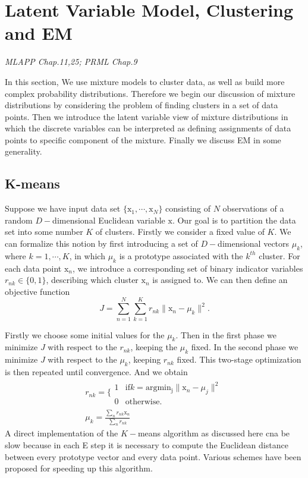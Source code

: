 \documentclass{article}
\newcommand{\mrm}{\mathrm}
\begin{document}
\section{Latent Variable Model, Clustering and EM}
\emph{MLAPP Chap.11,25; PRML Chap.9}

In this section, We use mixture models to cluster data, as well as build more complex probability distributions. Therefore we begin our discussion of mixture distributions by considering the problem of finding clusters in a set of data points. Then we introduce the latent variable view of mixture distributions in which the discrete variables can be interpreted as defining assignments of data points to specific component of the mixture. Finally we discuss EM in some generality.
\subsection{K-means}
Suppose we have input data set $\{\mrm x_1,\cdots, \mrm x_N\}$ consisting of $N$ observations of a random $D-$dimensional Euclidean variable $\mrm x$. Our goal is to partition the data set into some number $K$ of clusters.  Firstly we consider a fixed value of $K$. We can formalize this notion by first introducing a set of $D-$dimensional vectors $\mu_k$, where $k=1,\cdots,K$, in which $\mu_k$ is a prototype associated with the $k^{th}$ cluster. For each data point $\mrm x_n$, we introduce a corresponding set of binary indicator variables $r_{nk} \in \{0,1\}$, describing which cluster $\mrm x_n$ is assigned to. We can then define an objective function
\begin{equation}
J = \sum_{n=1}^{N}\sum_{k=1}^{K}r_{nk}\|\mrm x_n-\mu_k\|^2.
\end{equation}

Firstly we choose some initial values for the $\mu_k$. Then in the first phase we minimize $J$ with respect to the $r_{nk}$, keeping the $\mu_k$ fixed. In the second phase we minimize $J$ with respect to the $\mu_k$, keeping $r_{nk}$ fixed. This two-stage optimization is then repeated until convergence. And we obtain
\begin{gather}\label{}
  r_{nk}=\{\begin{matrix}
                 1 & \mrm{if }k=\mrm{arg min_j}\|\mrm x_n-\mu_j\|^2 \\
                 0 & \mrm{otherwise}.
               \end{matrix} \\
  \mu_k = \frac{\sum_nr_{nk}\mrm x_n}{\sum_nr_{nk}}
\end{gather}
A direct implementation of the $K-$means algorithm as discussed here cna be slow because in each E step it is necessary to compute the Euclidean distance between every prototype vector and every data point. Various schemes have been proposed for speeding up this algorithm.
\end{document}

